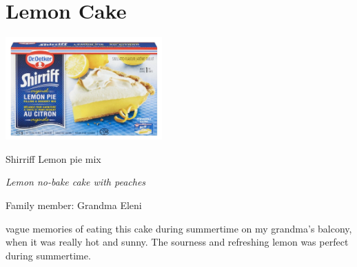 \chapter{Lemon Cake}
\label{ch:Lemoncake}


\begin{marginfigure}[20pt]
  \includegraphics[width=60mm]{monanteras/images/Shirriff Lemon pie mix.png}
  \caption{Shirriff Lemon pie mix}
\end{marginfigure}

\textit{Lemon no-bake cake with peaches}

Family member: Grandma Eleni

 vague memories of eating this cake during summertime on my grandma's balcony, when it was really hot and sunny. The sourness and refreshing lemon was perfect during summertime.

